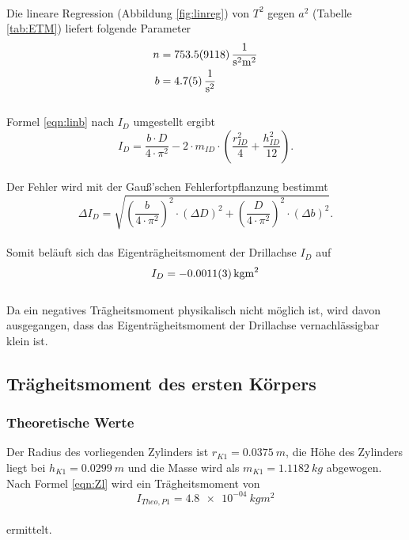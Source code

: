 \\Die lineare Regression (Abbildung \ref{fig:linreg}) von $T^2$ gegen $a^2$ (Tabelle \ref{tab:ETM}) liefert folgende Parameter
\begin{align*}
  n &= \SI{753.5 \pm 911.8}{\frac{1}{s^2 m^2}}\\
  b &= \SI{4.7 \pm 0.5}{\frac{1}{s^2}}
\end{align*}
\\Formel \eqref{eqn:linb} nach $I_{D}$ umgestellt ergibt
\begin{equation*}
  I_{D} = \frac{b \cdot D}{4 \cdot \pi^2} - 2 \cdot m_{ID} \cdot \left( \frac{r_{ID}^2}{4} + \frac{h_{ID}^2}{12} \right).
\end{equation*}
\\Der Fehler wird mit der Gauß'schen Fehlerfortpflanzung bestimmt
\begin{equation}
  \Delta I_{D} = \sqrt{ \left(\frac{b}{4 \cdot \pi^2}\right)^2 \cdot (\Delta D)^2 + \left(\frac{D}{4 \cdot \pi^2}\right)^2 \cdot (\Delta b)^2}.
\label{eqn:gaussID}
\end{equation}
\\Somit beläuft sich das Eigenträgheitsmoment der Drillachse $I_{D}$ auf
\begin{equation*}
  I_{D} = \SI{-0.0011 \pm 0.0003}{kg m^2}
\end{equation*}
\\Da ein negatives Trägheitsmoment physikalisch nicht möglich ist, wird davon ausgegangen, dass das Eigenträgheitsmoment der Drillachse vernachlässigbar klein ist.


\subsection{Trägheitsmoment des ersten Körpers}


\subsubsection{Theoretische Werte}
Der Radius des vorliegenden Zylinders ist $r_{K1}=\SI{0.0375}{m}$, die Höhe des Zylinders liegt bei $h_{K1}=\SI{0.0299}{m}$ und die Masse wird als $m_{K1}=\SI{1.1182}{kg}$ abgewogen.
Nach Formel \eqref{eqn:Zl} wird ein Trägheitsmoment von\\
\begin{equation*}
  I_{Theo, P1}= \SI{4.8e-04}{kg m^2}
\end{equation*}
\\ermittelt.

